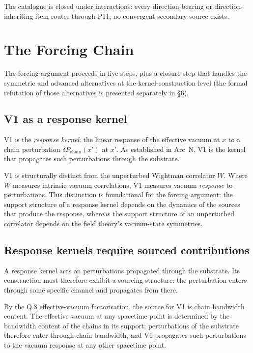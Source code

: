 \documentclass[11pt,a4paper]{article}
\begin{document}
The catalogue is closed under interactions: every direction-bearing or direction-inheriting item routes through P11; no convergent secondary source exists.

\section{The Forcing Chain}

The forcing argument proceeds in five steps, plus a closure step that handles the symmetric and advanced alternatives at the kernel-construction level (the formal refutation of those alternatives is presented separately in \S6).

\subsection{V1 as a response kernel}

V1 is the \emph{response kernel}: the linear response of the effective vacuum at $x$ to a chain perturbation $\delta P_\mathrm{chain}(x')$ at $x'$. As established in Arc~N, V1 is the kernel that propagates such perturbations through the substrate.

V1 is structurally distinct from the unperturbed Wightman correlator $W$. Where $W$ measures intrinsic vacuum correlations, V1 measures vacuum \emph{response} to perturbations. This distinction is foundational for the forcing argument: the support structure of a response kernel depends on the dynamics of the sources that produce the response, whereas the support structure of an unperturbed correlator depends on the field theory's vacuum-state symmetries.

\subsection{Response kernels require sourced contributions}

A response kernel acts on perturbations propagated through the substrate. Its construction must therefore exhibit a sourcing structure: the perturbation enters through some specific channel and propagates from there.

By the Q.8 effective-vacuum factorisation, the source for V1 is chain bandwidth content. The effective vacuum at any spacetime point is determined by the bandwidth content of the chains in its support; perturbations of the substrate therefore enter through chain bandwidth, and V1 propagates such perturbations to the vacuum response at any other spacetime point.
\end{document}
